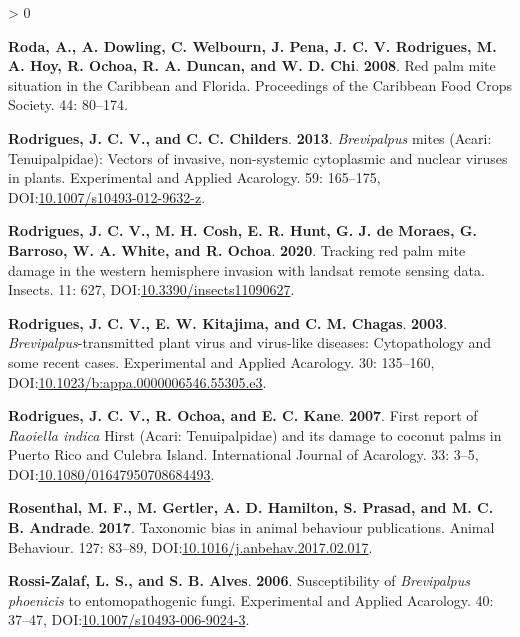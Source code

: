 \documentclass{ufdissertation}[overrideChapters] %
\newlength{\cslhangindent}
\newenvironment{CSLReferences}[2] %
 {%
  \setlength{\parindent}{0pt}
  \ifodd #1 \everypar{\setlength{\hangindent}{\cslhangindent}}\ignorespaces\fi
  \ifnum #2 > 0
  \setlength{\parskip}{#2\baselineskip}
  \fi
 }%
 {}
\begin{document}
{\begin{CSLReferences}{1}{1}
\leavevmode{}%
\textbf{Roda, A., A. Dowling, C. Welbourn, J. Pena, J. C. V. Rodrigues, M. A. Hoy, R. Ochoa, R. A. Duncan, and W. D. Chi}. \textbf{2008}. Red palm mite situation in the {Caribbean} and {Florida}. Proceedings of the Caribbean Food Crops Society. 44: 80--174.

\leavevmode{}%
\textbf{Rodrigues, J. C. V., and C. C. Childers}. \textbf{2013}. {\emph{Brevipalpus}} mites ({Acari}: {Tenuipalpidae}): Vectors of invasive, non-systemic cytoplasmic and nuclear viruses in plants. Experimental and Applied Acarology. 59: 165--175, DOI:\href{https://doi.org/10.1007/s10493-012-9632-z}{10.1007/s10493-012-9632-z}.

\leavevmode{}%
\textbf{Rodrigues, J. C. V., M. H. Cosh, E. R. Hunt, G. J. de Moraes, G. Barroso, W. A. White, and R. Ochoa}. \textbf{2020}. Tracking red palm mite damage in the western hemisphere invasion with landsat remote sensing data. Insects. 11: 627, DOI:\href{https://doi.org/10.3390/insects11090627}{10.3390/insects11090627}.

\leavevmode{}%
\textbf{Rodrigues, J. C. V., E. W. Kitajima, and C. M. Chagas}. \textbf{2003}. {\emph{Brevipalpus}}-transmitted plant virus and virus-like diseases: Cytopathology and some recent cases. Experimental and Applied Acarology. 30: 135--160, DOI:\href{https://doi.org/10.1023/b:appa.0000006546.55305.e3}{10.1023/b:appa.0000006546.55305.e3}.

\leavevmode{}%
\textbf{Rodrigues, J. C. V., R. Ochoa, and E. C. Kane}. \textbf{2007}. First report of {\emph{Raoiella indica}} {Hirst} ({Acari}: {Tenuipalpidae}) and its damage to coconut palms in {Puerto Rico} and {Culebra Island}. International Journal of Acarology. 33: 3--5, DOI:\href{https://doi.org/10.1080/01647950708684493}{10.1080/01647950708684493}.

\leavevmode{}%
\textbf{Rosenthal, M. F., M. Gertler, A. D. Hamilton, S. Prasad, and M. C. B. Andrade}. \textbf{2017}. Taxonomic bias in animal behaviour publications. Animal Behaviour. 127: 83--89, DOI:\href{https://doi.org/10.1016/j.anbehav.2017.02.017}{10.1016/j.anbehav.2017.02.017}.

\leavevmode{}%
\textbf{Rossi-Zalaf, L. S., and S. B. Alves}. \textbf{2006}. Susceptibility of {\emph{Brevipalpus phoenicis}} to entomopathogenic fungi. Experimental and Applied Acarology. 40: 37--47, DOI:\href{https://doi.org/10.1007/s10493-006-9024-3}{10.1007/s10493-006-9024-3}.


\end{CSLReferences}}
\end{document}
